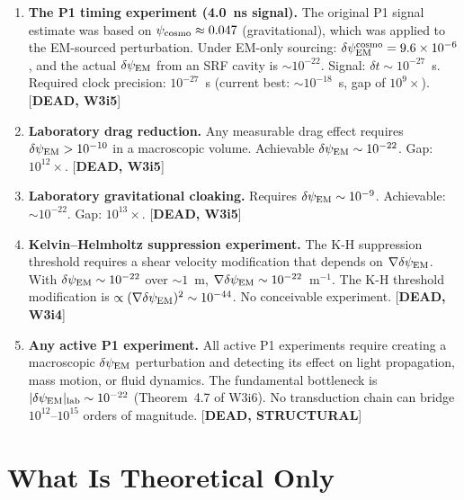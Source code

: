 \documentclass[11pt]{article}
\newcommand{\ee}[1]{\times 10^{#1}}
\newcommand{\dpsiEM}{\delta\psi_{\rm EM}}
\theoremstyle{definition}
\theoremstyle{remark}
\begin{document}
\begin{tcolorbox}[colback=red!5!white, colframe=red!60!black,
  title=\textbf{P1: What Is Dead (Experimentally Infeasible)}]

\begin{enumerate}[label=\textbf{D\arabic*.}, itemsep=4pt]

\item \textbf{The P1 timing experiment (4.0~ns signal).}
  The original P1 signal estimate was based on $\psi_{\rm cosmo}
  \approx 0.047$ (gravitational), which was applied to the EM-sourced
  perturbation. Under EM-only sourcing: $\dpsiEM^{\rm cosmo}
  = 9.6\ee{-6}$, and the actual $\dpsiEM$ from an SRF cavity is
  $\sim 10^{-22}$. Signal: $\delta t \sim 10^{-27}$~s. Required
  clock precision: $10^{-27}$~s (current best: $\sim 10^{-18}$~s,
  gap of $10^{9}\times$). [\textbf{DEAD, W3i5}]

\item \textbf{Laboratory drag reduction.}
  Any measurable drag effect requires $\dpsiEM > 10^{-10}$ in a
  macroscopic volume. Achievable $\dpsiEM \sim 10^{-22}$. Gap:
  $10^{12}\times$. [\textbf{DEAD, W3i5}]

\item \textbf{Laboratory gravitational cloaking.}
  Requires $\dpsiEM \sim 10^{-9}$. Achievable: $\sim 10^{-22}$.
  Gap: $10^{13}\times$. [\textbf{DEAD, W3i5}]

\item \textbf{Kelvin--Helmholtz suppression experiment.}
  The K-H suppression threshold requires a shear velocity modification
  that depends on $\nabla\dpsiEM$. With $\dpsiEM \sim 10^{-22}$ over
  $\sim 1$~m, $\nabla\dpsiEM \sim 10^{-22}$~m$^{-1}$. The K-H
  threshold modification is $\propto (\nabla\dpsiEM)^2 \sim 10^{-44}$.
  No conceivable experiment. [\textbf{DEAD, W3i4}]

\item \textbf{Any active P1 experiment.}
  All active P1 experiments require creating a macroscopic
  $\dpsiEM$ perturbation and detecting its effect on light
  propagation, mass motion, or fluid dynamics. The fundamental
  bottleneck is $|\dpsiEM|_{\rm lab} \sim 10^{-22}$
  (Theorem~4.7 of W3i6). No transduction chain can bridge
  $10^{12}$--$10^{15}$ orders of magnitude.
  [\textbf{DEAD, STRUCTURAL}]
\end{enumerate}
\end{tcolorbox}

\section{What Is Theoretical Only}
\label{sec:P1_theoretical}
\end{document}
